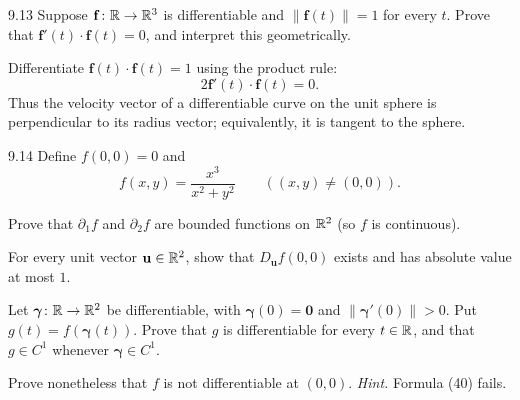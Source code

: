 \documentclass[11pt,oneside]{article}
\begin{document}
\begin{exercise}{9.13}
Suppose $\mathbf f\colon\mathbb{R}\to\mathbb{R}^3$ is differentiable and $\|\mathbf f(t)\|=1$ for every $t$. Prove that $\mathbf f'(t)\cdot\mathbf f(t)=0$, and interpret this geometrically.
\end{exercise}
\begin{solution}
Differentiate $\mathbf f(t)\cdot\mathbf f(t)=1$ using the product rule:
\[
 2\mathbf f'(t)\cdot\mathbf f(t)=0.
\]
Thus the velocity vector of a differentiable curve on the unit sphere is perpendicular to its radius vector; equivalently, it is tangent to the sphere.
\end{solution}

\begin{exercise}{9.14}
Define $f(0,0)=0$ and
\[
 f(x,y)=\frac{x^3}{x^2+y^2}\qquad((x,y)\ne(0,0)).
\]
\begin{exercisesubparts}
\item Prove that $\partial_1 f$ and $\partial_2 f$ are bounded functions on $\mathbb{R}^2$ (so $f$ is continuous).
\item For every unit vector $\mathbf u\in\mathbb{R}^2$, show that $D_{\mathbf u}f(0,0)$ exists and has absolute value at most $1$.
\item Let $\boldsymbol\gamma\colon\mathbb{R}\to\mathbb{R}^2$ be differentiable, with $\boldsymbol\gamma(0)=\mathbf0$ and $\|\boldsymbol\gamma'(0)\|>0$. Put $g(t)=f(\boldsymbol\gamma(t))$. Prove that $g$ is differentiable for every $t\in\mathbb{R}$, and that $g\in C^1$ whenever $\boldsymbol\gamma\in C^1$.
\item Prove nonetheless that $f$ is not differentiable at $(0,0)$. 
\textit{Hint.} Formula (40) fails.
\end{exercisesubparts}
\end{exercise}
\end{document}
